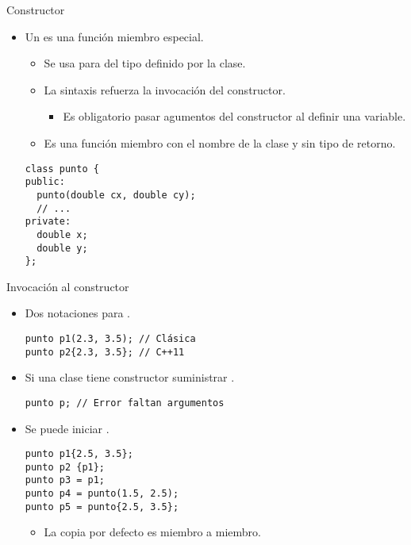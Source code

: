 \begin{frame}[t,fragile]{Constructor}
\begin{itemize}
  \item Un  es una función miembro especial.
    \begin{itemize}
      \item Se usa para  del tipo definido por la clase.
      \item La sintaxis refuerza la invocación del constructor.
        \begin{itemize}
          \item Es obligatorio pasar agumentos del constructor al definir una variable.
        \end{itemize}
      \item Es una función miembro con el nombre de la clase y sin tipo de retorno.
    \end{itemize}
\begin{lstlisting}
class punto {
public:
  punto(double cx, double cy);
  // ...
private:
  double x;
  double y;
};
\end{lstlisting}
\end{itemize}
\end{frame}

\begin{frame}[t,fragile]{Invocación al constructor}
\begin{itemize}
  \item Dos notaciones para .
\begin{lstlisting}
punto p1(2.3, 3.5); // Clásica
punto p2{2.3, 3.5}; // C++11
\end{lstlisting}

  \item Si una clase tiene constructor  suministrar 
        .
\begin{lstlisting}
punto p; // Error faltan argumentos
\end{lstlisting}

  \item Se puede iniciar .
\begin{lstlisting}
punto p1{2.5, 3.5};
punto p2 {p1};
punto p3 = p1;
punto p4 = punto(1.5, 2.5);
punto p5 = punto{2.5, 3.5};
\end{lstlisting}
    \begin{itemize}
      \item La copia por defecto es miembro a miembro.
    \end{itemize}
\end{itemize}
\end{frame}

